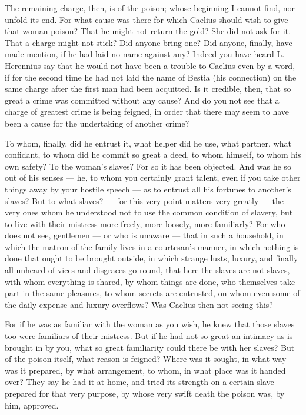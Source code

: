  The remaining charge, then, is of the poison; whose beginning I cannot find, nor unfold its end. For what cause was there for which Caelius should wish to give that woman poison? That he might not return the gold? She did not ask for it. That a charge might not stick? Did anyone bring one? Did anyone, finally, have made mention, if he had laid no name against any? Indeed you have heard L. Herennius say that he would not have been a trouble to Caelius even by a word, if for the second time he had not laid the name of Bestia (his connection) on the same charge after the first man had been acquitted. Is it credible, then, that so great a crime was committed without any cause? And do you not see that a charge of greatest crime is being feigned, in order that there may seem to have been a cause for the undertaking of another crime?

 To whom, finally, did he entrust it, what helper did he use, what partner, what confidant, to whom did he commit so great a deed, to whom himself, to whom his own safety? To the woman's slaves? For so it has been objected. And was he so out of his senses --- he, to whom you certainly grant talent, even if you take other things away by your hostile speech --- as to entrust all his fortunes to another's slaves? But to what slaves? --- for this very point matters very greatly --- the very ones whom he understood not to use the common condition of slavery, but to live with their mistress more freely, more loosely, more familiarly? For who does not see, gentlemen --- or who is unaware --- that in such a household, in which the matron of the family lives in a courtesan's manner, in which nothing is done that ought to be brought outside, in which strange lusts, luxury, and finally all unheard-of vices and disgraces go round, that here the slaves are not slaves, with whom everything is shared, by whom things are done, who themselves take part in the same pleasures, to whom secrets are entrusted, on whom even some of the daily expense and luxury overflows? Was Caelius then not seeing this?

 For if he was as familiar with the woman as you wish, he knew that those slaves too were familiars of their mistress. But if he had not so great an intimacy as is brought in by you, what so great familiarity could there be with her slaves? But of the poison itself, what reason is feigned? Where was it sought, in what way was it prepared, by what arrangement, to whom, in what place was it handed over? They say he had it at home, and tried its strength on a certain slave prepared for that very purpose, by whose very swift death the poison was, by him, approved.

